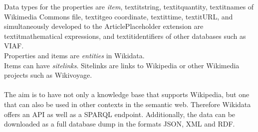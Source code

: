 Data types for the properties are \textit{item}, textit{string}, textit{quantity}, textit{names of Wikimedia Commons file}, textit{geo coordinate}, textit{time}, textit{URL}, and simultaneously developed to the ArticlePlaceholder extension are textit{mathematical expressions}, and textit{identifiers of other databases} such as VIAF. \\
Properties and items are \textit{entities} in Wikidata. \\
Items can have \textit{sitelinks}. Sitelinks are links to Wikipedia or other Wikimedia projects such as Wikivoyage. \\
\\
The aim is to have not only a knowledge base that supports Wikipedia, but one that can also be used in other contexts in the semantic web. Therefore Wikidata offers an API as well as a SPARQL endpoint. Additionally, the data can be downloaded as a full database dump in the formats JSON, XML and RDF. 